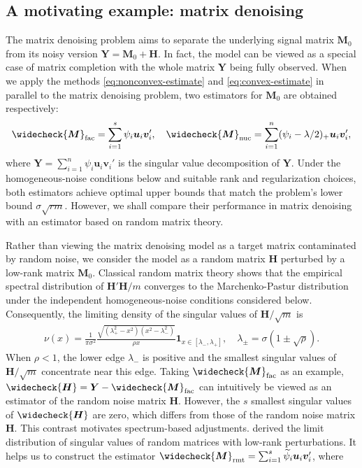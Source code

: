 \documentclass[numsec,webpdf,modern,large,namedate]{oup-authoring-template}
\theoremstyle{plain}
\theoremstyle{remark}
\newcommand{\M}{\bm{M}}
\newcommand{\bH}{\bm{H}}
\newcommand{\Y}{\bm{Y}}
\newcommand{\bu}{\bm{u}}
\newcommand{\bv}{\bm{v}}
\begin{document}
\subsection{A motivating example: matrix denoising}

The matrix denoising problem aims to separate the underlying signal matrix $\M_0$ from its noisy version $\Y = \M_0 + \bH$. In fact, the model can be viewed as a special case of matrix completion with the whole matrix $\Y$ being fully observed. When we apply the methods \eqref{eq:nonconvex-estimate} and \eqref{eq:convex-estimate} in parallel to the matrix denoising problem, two estimators for $\M_0$ are obtained respectively:
\begin{align*}
    \widecheck{\M}_{\text{fac}} = \sum_{i=1}^s \psi_i \bu_i \bv_i',\quad \widecheck{\M}_{\text{nuc}} = \sum_{i=1}^n (\psi_i - \lambda/2)_{+}\bu_i \bv_i',
\end{align*}
where $\Y = \sum_{i=1}^n \psi_i \bu_i \bv_i'$ is the singular value decomposition of $\Y$. 
Under the homogeneous-noise conditions below and suitable rank and regularization choices, both estimators achieve optimal upper bounds that match the problem's lower bound $\sigma\sqrt{rm}$. However, we shall compare their performance in matrix denoising with an estimator based on random matrix theory.


Rather than viewing the matrix denoising model as a target matrix contaminated by random noise, we consider the model as a random matrix $\bH$ perturbed by a low-rank matrix $\M_0$. Classical random matrix theory \citep{bai2010spectral} shows that the empirical spectral distribution of $\bH'\bH/m$ converges to the Marchenko-Pastur distribution under the independent homogeneous-noise conditions considered below. Consequently, the limiting density of the singular values of $\bH/\sqrt{m}$ is
\begin{align*}
    \nu(x) = \frac{1}{\pi \sigma^2}\frac{\sqrt{(\lambda^2_{+}-x^2)(x^2-\lambda^2_{-})}}{\rho x}\mathbf{1}_{x\in[\lambda_{-},\lambda_{+}]},\quad \lambda_{\pm} = \sigma(1\pm\sqrt{\rho}).
\end{align*}
When $\rho<1$, the lower edge $\lambda_-$ is positive and the smallest singular values of $\bH/\sqrt m$ concentrate near this edge. Taking $\widecheck{\M}_{\text{fac}}$ as an example, $\widecheck{\bH} = \Y - \widecheck{\M}_{\text{fac}}$ can intuitively be viewed as an estimator of the random noise matrix $\bH$. However, the $s$ smallest singular values of $\widecheck{\bH}$ are zero, which differs from those of the random noise matrix $\bH$. This contrast motivates spectrum-based adjustments. \cite{benaych2012singular} derived the limit distribution of singular values of random matrices with low-rank perturbations. It helps us to construct the estimator $\widecheck{\M}_{\text{rmt}} = \sum_{i=1}^s \widetilde{\psi}_i \bu_i \bv_i'$, where
\end{document}
